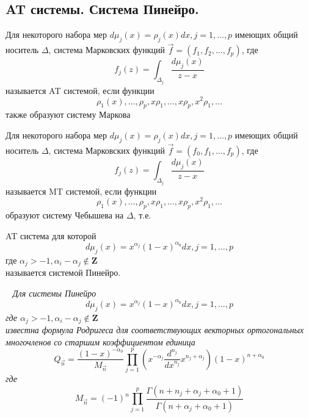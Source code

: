 \subsection{AT системы. Система Пинейро.}
\begin{defi}
Для некоторого набора мер $d\mu_j(x)=\rho_j (x)dx, j=1,\ldots,p$
имеющих общий носитель ${\Delta}$, система Марковских функций
$\overrightarrow{f}=(f_1,f_2,\ldots,f_p)$, где
$$
 f_j(z)
=\int_{\Delta_j}{\displaystyle\frac{d\mu_j(x)}{z-x}}
$$
называется AT системой, если функции
$$
\rho_1(x),\ldots,\rho_p,x \rho_1,\ldots, x\rho_p, x^2\rho_1,
\ldots
$$
также образуют систему Маркова
\end{defi}

\begin{defi}
Для некоторого набора мер $d\mu_j(x)=\rho_j (x)dx, j=1,\ldots,p$
имеющих общий носитель ${\Delta}$, система Марковских функций
$\overrightarrow{f}=(f_0,f_1,\ldots,f_p)$, где
$$
 f_j(z)
=\int_{\Delta_j}{\displaystyle\frac{d\mu_j(x)}{z-x}}
$$
называется MT системой, если функции
$$
\rho_1(x),\ldots,\rho_p,x \rho_1,\ldots, x\rho_p, x^2\rho_1,
\ldots
$$
образуют систему Чебышева на $\Delta$, т.е.
\end{defi}

\begin{defi}
AT система для которой
$$
d\mu_j(x)=x^{\alpha_j}(1-x)^{\alpha_0}dx, j=1,\ldots,p
$$
где $\alpha_j>-1, \alpha_i-\alpha_j \not \in \textbf{Z}$ \\
называется системой Пинейро.
\end{defi}


\begin{teor} \rm ~\cite{AptekaaKaliaJvaniseg} \textit{
Для системы Пинейро
$$
d\mu_j(x)=x^{\alpha_j}(1-x)^{\alpha_0}dx, j=1,\ldots,p
$$
где $\alpha_j>-1, \alpha_i-\alpha_j \not \in \textbf{Z}$ \\
известна формула Родригеса для соответствующих векторных
ортогональных многочленов со старшим коэффициентом единица
$$
Q_{\overrightarrow{n}}=\frac{(1-x)^{-\alpha_0}}{M_{\overrightarrow{n}}}
\prod_{j=1}^{p} { \left( x^{-\alpha_j} \frac{d^{n_j}} {dx^{n_j}}
x^{n_j+\alpha_j} \right) (1-x)^{n+\alpha_0}}
$$
где
$$
M_{\overrightarrow{n}}=(-1)^{n} \prod_{j=1}^{p} {
\frac{\Gamma(n+n_j+\alpha_j+\alpha_0+1)}{\Gamma(n+\alpha_j+\alpha_0+1)}}
$$}
\end{teor}

